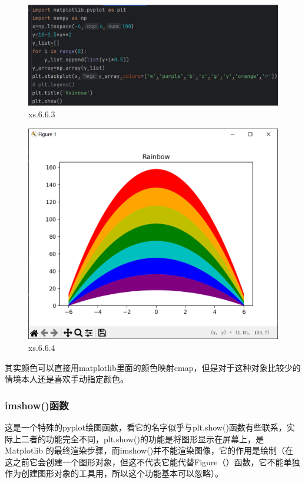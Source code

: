 \documentclass[12pt]{article}
\begin{document}
\begin{figure}[H]
    \centering
    \includegraphics[width=1\linewidth]{堆积面积图 program2.png}
    \caption{xs.6.6.3}
    \label{fig:enter-label}
\end{figure}
\begin{figure}[H]
    \centering
    \includegraphics[width=0.75\linewidth]{堆积面积图 Pic2.png}
    \caption{xs.6.6.4}
    \label{fig:enter-label}
\end{figure}
\noindent 其实颜色可以直接用matplotlib里面的颜色映射cmap，但是对于这种对象比较少的情境本人还是喜欢手动指定颜色。
\newpage

\subsubsection{imshow()函数}
这是一个特殊的pyplot绘图函数，看它的名字似乎与plt.show()函数有些联系，实际上二者的功能完全不同，plt.show()的功能是将图形显示在屏幕上，是 Matplotlib 的最终渲染步骤，而imshow()并不能渲染图像，它的作用是绘制（在这之前它会创建一个图形对象，但这不代表它能代替Figure（）函数，它不能单独作为创建图形对象的工具用，所以这个功能基本可以忽略）。
\end{document}
